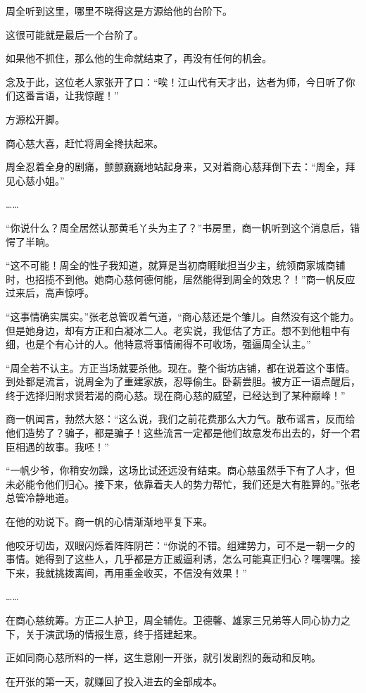 \begin{this_body}
周全听到这里，哪里不晓得这是方源给他的台阶下。

这很可能就是最后一个台阶了。

如果他不抓住，那么他的生命就结束了，再没有任何的机会。

念及于此，这位老人家张开了口：“唉！江山代有天才出，达者为师，今日听了你们这番言语，让我惊醒！”

方源松开脚。

商心慈大喜，赶忙将周全搀扶起来。

周全忍着全身的剧痛，颤颤巍巍地站起身来，又对着商心慈拜倒下去：“周全，拜见心慈小姐。”

……

“你说什么？周全居然认那黄毛丫头为主了？”书房里，商一帆听到这个消息后，错愕了半晌。

“这不可能！周全的性子我知道，就算是当初商睚眦担当少主，统领商家城商铺时，也招揽不到他。她商心慈何德何能，居然能得到周全的效忠？！”商一帆反应过来后，高声惊呼。

“这事情确实属实。”张老总管叹着气道，“商心慈还是个雏儿。自然没有这个能力。但是她身边，却有方正和白凝冰二人。老实说，我低估了方正。想不到他粗中有细，也是个有心计的人。他特意将事情闹得不可收场，强逼周全认主。”

“周全若不认主。方正当场就要杀他。现在。整个街坊店铺，都在说着这个事情。到处都是流言，说周全为了重建家族，忍辱偷生。卧薪尝胆。被方正一语点醒后，终于选择归附求贤若渴的商心慈。现在商心慈的威望，已经达到了某种巅峰！”

商一帆闻言，勃然大怒：“这么说，我们之前花费那么大力气。散布谣言，反而给他们造势了？骗子，都是骗子！这些流言一定都是他们故意发布出去的，好一个君臣相遇的故事。我呸！”

“一帆少爷，你稍安勿躁，这场比试还远没有结束。商心慈虽然手下有了人才，但未必能令他们归心。接下来，依靠着夫人的势力帮忙，我们还是大有胜算的。”张老总管冷静地道。

在他的劝说下。商一帆的心情渐渐地平复下来。

他咬牙切齿，双眼闪烁着阵阵阴芒：“你说的不错。组建势力，可不是一朝一夕的事情。她得到了这些人，几乎都是方正威逼利诱，怎么可能真正归心？嘿嘿嘿。接下来，我就挑拨离间，再用重金收买，不信没有效果！”

……

在商心慈统筹。方正二人护卫，周全辅佐。卫德馨、雄家三兄弟等人同心协力之下，关于演武场的情报生意，终于搭建起来。

正如同商心慈所料的一样，这生意刚一开张，就引发剧烈的轰动和反响。

在开张的第一天，就赚回了投入进去的全部成本。


\end{this_body}
